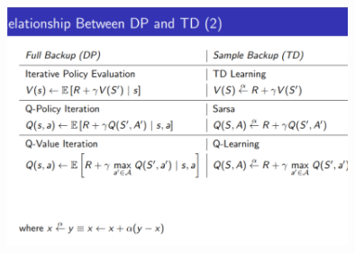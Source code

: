 \documentclass[a4paper]{article}
\begin{document}
\begin{itemize}
\begin{center}
\end{center}
\begin{center}
\includegraphics[width = \textwidth, height=7cm]{images/summary2.png}
\end{center}
\end{itemize}
\end{document}

